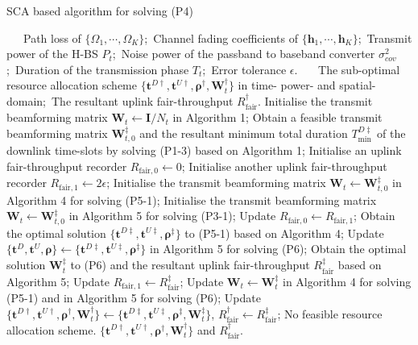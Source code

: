 \documentclass[12pt,draft,onecolumn,journal]{IEEEtran}
\begin{document}
\begin{algorithm}[!t]
	\caption{SCA based algorithm for solving (P4)}
	\footnotesize
	\begin{algorithmic}[1]
		\REQUIRE ~~\
		Path loss of $\{\Omega_1,\cdots,\Omega_K\}$;\
		Channel fading coefficients of $\{\mathbf{h}_1,\cdots,\mathbf{h}_K\}$;\
		Transmit power of the H-BS $P_{t}$;\
		Noise power of the passband to baseband converter $\sigma^2_{cov}$;\
		Duration of the transmission phase $T_t$;\
		Error tolerance $\epsilon$.
		\ENSURE ~~\
		The sub-optimal resource allocation scheme $\{\mathbf{t}^{D\dagger}, \mathbf{t}^{U\dagger}, \boldsymbol{\rho}^{\dagger}, \mathbf{W}_t^{\dagger}\}$ in time- power- and spatial-domain;\
		The resultant uplink fair-throughput $R_{\text{fair}}^{\dagger}$.
		\STATE Initialise the transmit beamforming matrix $\mathbf{W}_t\leftarrow \mathbf{I} / N_t$ in Algorithm 1;
		\STATE Obtain a feasible transmit beamforming matrix $\mathbf{W}_{t,0}^{\ddagger}$ and the resultant minimum total duration $T_{\min}^{D\ddagger}$ of the downlink time-slots by solving (P1-3) based on Algorithm 1;
		\IF{$T_{\min}^{D\ddagger} < T_t$}
			\STATE Initialise an uplink fair-throughput recorder $R_{\text{fair},0}\leftarrow 0$;
			\STATE Initialise another uplink fair-throughput recorder $R_{\text{fair},1}\leftarrow 2\epsilon$;
			\STATE Initialise the transmit beamforming matrix $\mathbf{W}_t\leftarrow \mathbf{W}_{t,0}^{\ddagger}$ in Algorithm 4 for solving (P5-1);
			\STATE Initialise the transmit beamforming matrix $\mathbf{W}_t\leftarrow \mathbf{W}_{t,0}^{\ddagger}$ in Algorithm 5 for solving (P3-1);
				\STATE Update $R_{\text{fair},0}\leftarrow R_{\text{fair},1}$;
				\STATE Obtain the optimal solution $\{\mathbf{t}^{D\ddagger}, \mathbf{t}^{U\ddagger}, \boldsymbol{\rho}^{\ddagger}\}$ to (P5-1) based on Algorithm 4;
				\STATE Update $\{\mathbf{t}^{D}, \mathbf{t}^{U}, \boldsymbol{\rho}\}\leftarrow \{\mathbf{t}^{D\ddagger}, \mathbf{t}^{U\ddagger}, \boldsymbol{\rho}^{\ddagger}\}$ in Algorithm 5 for solving (P6);
				\STATE Obtain the optimal solution $\mathbf{W}_t^{\ddagger}$ to (P6) and the resultant uplink fair-throughput $R_{\text{fair}}^{\ddagger}$ based on Algorithm 5;
				\STATE Update $R_{\text{fair},1}\leftarrow R_{\text{fair}}^{\ddagger}$;
				\STATE Update $\mathbf{W}_t \leftarrow \mathbf{W}_t^{\ddagger}$ in Algorithm 4 for solving (P5-1) and in Algorithm 5 for solving (P6);
			\ENDWHILE
			\STATE Update $\{\mathbf{t}^{D\dagger}, \mathbf{t}^{U\dagger}, \boldsymbol{\rho}^{\dagger}, \mathbf{W}_t^{\dagger}\} \leftarrow \{\mathbf{t}^{D\ddagger}, \mathbf{t}^{U\ddagger}, \boldsymbol{\rho}^{\ddagger}, \mathbf{W}_t^{\ddagger}\}$, $R_{\text{fair}}^{\dagger}\leftarrow R_{\text{fair}}^{\ddagger}$;
		\ELSE
			\STATE No feasible resource allocation scheme.
		\ENDIF
		\RETURN $\{\mathbf{t}^{D\dagger}, \mathbf{t}^{U\dagger}, \boldsymbol{\rho}^{\dagger}, \mathbf{W}_t^{\dagger}\}$ and $R_{\text{fair}}^{\dagger}$.
	\end{algorithmic}
\end{algorithm}
\end{document}

